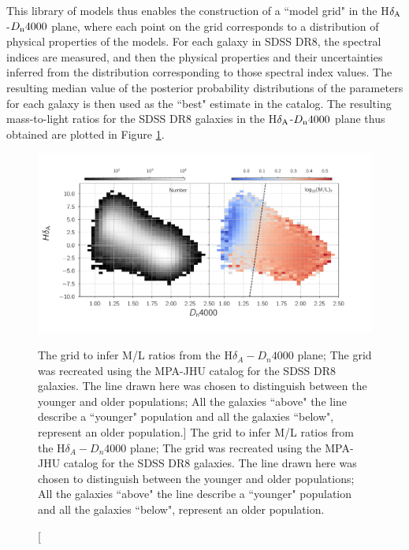 This library of models thus enables the construction of a 
``model grid" in the H$\delta_{\rm A}$-$D_{\rm n}4000$ plane,
where each point on the grid corresponds to a distribution of
physical properties of the models.
For each galaxy in SDSS DR8, the spectral indices are measured, 
and then the physical properties and their uncertainties inferred
from the distribution corresponding to those spectral index values.
The resulting median value of the posterior probability distributions 
of the parameters for each galaxy is then used 
as the ``best" estimate in the catalog. The resulting 
mass-to-light ratios for the SDSS DR8 galaxies in the 
H$\delta_{\rm A}$-$D_{\rm n}4000$ plane thus obtained are 
plotted in Figure \ref{fig:kauff_grid}.\\ 

\begin{figure}
\includegraphics[width=\textwidth]{figures/hd_d4000_mlratio_coarser_binning.pdf}
\caption[The \citet{kauffmann_stellar_2003} grid to infer M/L ratios from the H$\delta_{A}-D_{n}4000$ plane; The grid was recreated using the MPA-JHU catalog for the SDSS DR8 galaxies. The line drawn here was chosen to distinguish between the younger and older populations; All the galaxies ``above" the line describe a ``younger" population and all the galaxies ``below", represent an older population.]
{The \citet{kauffmann_stellar_2003} grid to infer M/L ratios from the H$\delta_{A}-D_{n}4000$ plane; The grid was recreated using the MPA-JHU catalog for the SDSS DR8 galaxies. The line drawn here was chosen to distinguish between the younger and older populations; All the galaxies ``above" the line describe a ``younger" population and all the galaxies ``below", represent an older population.
\label{fig:kauff_grid}}
\end{figure}

